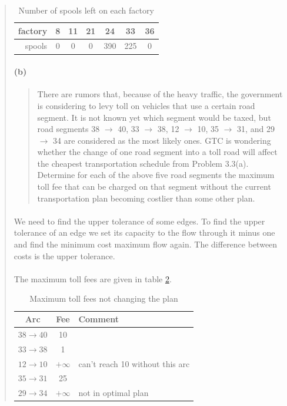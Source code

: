\begin{quote}
\begin{table}[H]
\centering
\begin{tabular}{|r|c|c|c|c|c|c|}
\hline
factory & 8 & 11 & 21 & 24 & 33 & 36 \\ \hline
spools & 0 & 0 & 0 & 390 & 225 & 0   \\ \hline
\end{tabular}
\caption{Number of spools left on each factory}
\label{spools-left}
\end{table}

\paragraph{(b)}
\begin{quote}
There are rumors that, because of the heavy traffic, the government is considering to levy toll on vehicles that use a certain road segment. It is not known yet which segment would be taxed, but road segments 38 $\rightarrow$ 40, 33 $\rightarrow$ 38, 12 $\rightarrow$ 10, 35 $\rightarrow$ 31, and 29 $\rightarrow$ 34 are considered as the most likely ones.
GTC is wondering whether the change of one road segment into a toll road will affect the cheapest transportation schedule from Problem 3.3(a). Determine for each of the above five road segments the maximum toll fee that can be charged on that segment without the current transportation plan becoming costlier than some other plan.
\end{quote}

\paragraph{}
We need to find the upper tolerance of some edges. To find the upper tolerance of an edge we set its capacity to the flow through it minus one and find the minimum cost maximum flow again. The difference between costs is the upper tolerance.

\paragraph{}
The maximum toll fees are given in table \ref{toll-fees}.

\begin{table}[H]
\centering
\begin{tabular}{|c|c|l|}
\hline
Arc & Fee & Comment \\ \hline
$ 38 \rightarrow 40 $ & 10 & \\ \hline
$ 33 \rightarrow 38 $ & 1 & \\ \hline
$ 12 \rightarrow 10 $ & $+\infty$ & can't reach 10 without this arc \\ \hline
$ 35 \rightarrow 31 $ & 25 & \\ \hline
$ 29 \rightarrow 34 $ & $+\infty$ & not in optimal plan \\ \hline
\end{tabular}
\caption{Maximum toll fees not changing the plan}
\label{toll-fees}
\end{table}


\end{quote}
